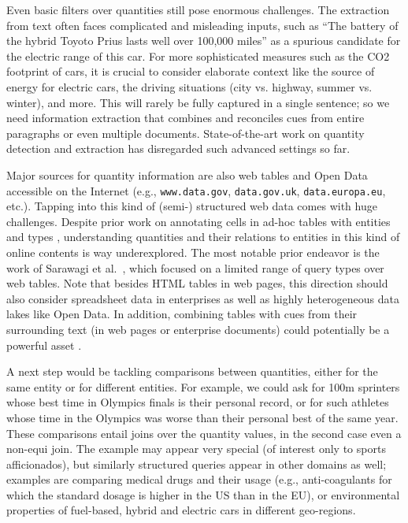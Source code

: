\documentclass[11pt]{article}
\begin{document}
%
Even basic filters over quantities still pose enormous challenges.
The extraction from text often faces complicated and misleading inputs, 
such as ``The battery of the hybrid Toyoto Prius lasts well over 100,000 miles''
as a spurious candidate for the electric range of this car.
For more sophisticated measures such as the CO2 footprint of cars, 
it is crucial to consider elaborate context like the source of energy for
electric cars, the driving situations (city vs. highway, summer vs. winter),
and more. This will rarely be fully captured in a single sentence;
so we need information extraction that combines and reconciles cues
from entire paragraphs or even multiple documents.
State-of-the-art work on quantity detection and extraction \cite{Alonso:SIGIR2018,Ho:ISWC2019,Ibrahim:CIKM2016,Roy:TACL2015,Saha:ACL2017,Sarawagi:KDD2014}
has disregarded such advanced settings so far.

Major sources for quantity information are also web tables
and Open Data accessible on the Internet (e.g., 
{\small\tt www.data.gov}, {\small\tt data.gov.uk}, {\small\tt data.europa.eu},
etc.).
Tapping into this kind of (semi-) structured web data comes with huge challenges.
Despite prior work on annotating cells in ad-hoc tables with entities and types
\cite{Bhagavatula:ISWC2015,Cafarella:PVLDB2018,Limaye:PVLDB2010,Venetis:PVLDB2011}, 
understanding quantities and their relations to entities in this kind of
online contents is way underexplored.
The most notable prior endeavor is the work of Sarawagi et al.~\cite{Sarawagi:KDD2014},
which focused on a limited range of query types over web tables.
Note that besides HTML tables in web pages, this direction should also consider 
spreadsheet data in enterprises as well as highly
heterogeneous data lakes like Open Data.
In addition, combining tables with cues from their surrounding text
(in web pages or enterprise documents) could potentially be a powerful asset
\cite{Ibrahim:ICDE2019}.
%


\vspace{0.2cm}
{}
A next step would be tackling comparisons between quantities, either
for the same entity or for different entities.
For example, we could ask for 100m sprinters whose best time in Olympics finals
is their personal record, or for such athletes whose time in the Olympics
was worse than their personal best of the same year.
These comparisons entail joins over the quantity values, in the second case
even a non-equi join.
The example may appear very special (of interest only to sports afficionados),
but similarly structured queries appear in other domains as well;
examples are comparing 
medical drugs and their usage 
(e.g., 
anti-coagulants
for which the 
standard dosage
is higher in the US than in the EU),
or environmental properties of fuel-based, hybrid and electric cars
in different geo-regions.
\end{document}
